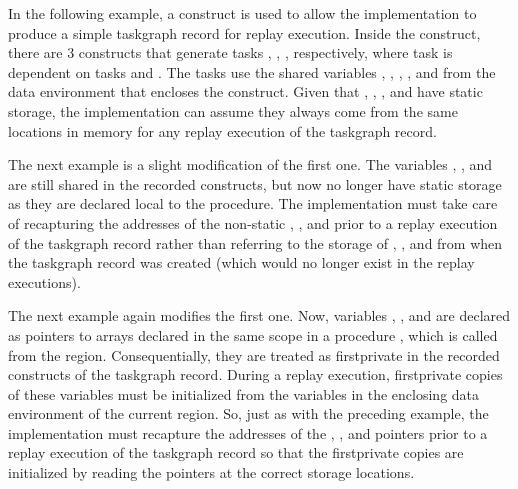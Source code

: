 In the following example, a  construct is used to allow the
implementation to produce a simple taskgraph record for replay execution.
Inside the construct, there are 3  constructs that generate tasks
, , , respectively, where task  is dependent on
tasks  and . The tasks use the shared variables ,
, , , and  from the data environment
that encloses the  construct. Given that , ,
, and  have static storage, the implementation can assume
they always come from the same locations in memory for any replay execution of
the taskgraph record.



The next example is a slight modification of the first one. The variables
, , and  are still shared in the recorded
 constructs, but now no longer have static storage as they are
declared local to the  procedure. The implementation
must take care of recapturing the addresses of the non-static ,
, and  prior to a replay execution of the taskgraph record
rather than referring to the storage of , , and 
from when the taskgraph record was created (which would no longer exist in the
replay executions).



The next example again modifies the first one. Now, variables ,
, and  are declared as pointers to arrays declared in the
same scope in a procedure , which is called from the
 region. Consequentially, they are treated as firstprivate in
the recorded  constructs of the taskgraph record. During a replay
execution, firstprivate copies of these variables must be initialized from the
variables in the enclosing data environment of the current 
region. So, just as with the preceding example, the implementation must
recapture the addresses of the , , and  pointers
prior to a replay execution of the taskgraph record so that the firstprivate
copies are initialized by reading the pointers at the correct storage locations.


